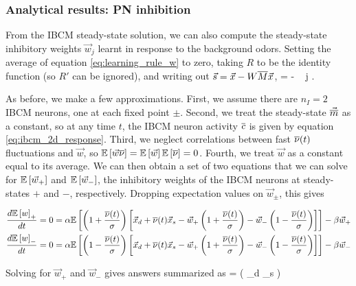 \subsubsection{Analytical results: PN inhibition}
\label{subsubsect:2d_model_analytical2}
From the IBCM steady-state solution, we can also compute the steady-state inhibitory weights $\vec{w}_j$ learnt in response to the background odors. Setting the average of equation \eqref{eq:learning_rule_w} to zero, taking $R$ to be the identity function (so $R'$ can be ignored), and writing out $\vec{s} = \vec{x} - W\overline{M}\vec{x}$, 
 = \alpha {} - \beta {}  \,\,\, \forall j \quad .
	\label{eq:w_ss_2d}
\eeq

As before, we make a few approximations. First, we assume there are $n_I=2$ IBCM neurons, one at each fixed point $\pm$. Second, we treat the steady-state $\vec{\overline{m}}$ as a constant, so at any time $t$, the IBCM neuron activity $\overline{c}$ is given by equation \eqref{eq:ibcm_2d_response}. Third, we neglect correlations between fast $\overline{\nu}(t)$ fluctuations and $\vec{w}$, so $\mathbb{E}\left[ \vec{w} \overline{\nu} \right] = \mathbb{E}\left[ \vec{w} \right] \mathbb{E}\left[ \overline{\nu} \right] = 0$. Fourth, we treat $\vec{w}$ as a constant equal to its average. We can then obtain a set of two equations that we can solve for $\mathbb{E}\left[ \vec{w}_+ \right]$ and $\mathbb{E}\left[ \vec{w}_- \right]$, the inhibitory weights of the IBCM neurons at steady-states $+$ and $-$, respectively. Dropping expectation values on $\vec{w}_{\pm}$, this gives

\begin{align*}
	\frac{d \mathbb{E}\left[ w \right]_+}{dt} = 0 &= \alpha \mathbb{E}\left[ \left(1 + \frac{\overline{\nu}(t)}{\sigma} \right) \left[\vec{x}_d + \overline{\nu}(t) \vec{x}_s - \vec{w}_+ \left(1 + \frac{\overline{\nu}(t)}{\sigma}\right) - \vec{w}_-  \left(1 - \frac{\overline{\nu}(t)}{\sigma}\right) \right]  \right] - \beta \vec{w}_+ 		 \\
	\frac{d \mathbb{E}\left[ w \right]_-}{dt} = 0 &= \alpha \mathbb{E}\left[ \left(1 - \frac{\overline{\nu}(t)}{\sigma} \right) \left[\vec{x}_d + \overline{\nu}(t) \vec{x}_s - \vec{w}_+ \left(1 + \frac{\overline{\nu}(t)}{\sigma}\right) - \vec{w}_-  \left(1 - \frac{\overline{\nu}(t)}{\sigma}\right) \right]  \right] - \beta \vec{w}_- 		 \\
\end{align*}

Solving for $\vec{w}_+$ and $\vec{w}_-$ gives answers summarized as
\beq
	 = \frac{\alpha}{2 \alpha + \beta} \left( _d \pm \sigma {}_s \right) 
	\label{eq:inhibition_weights_2d_solution}
\eeq

